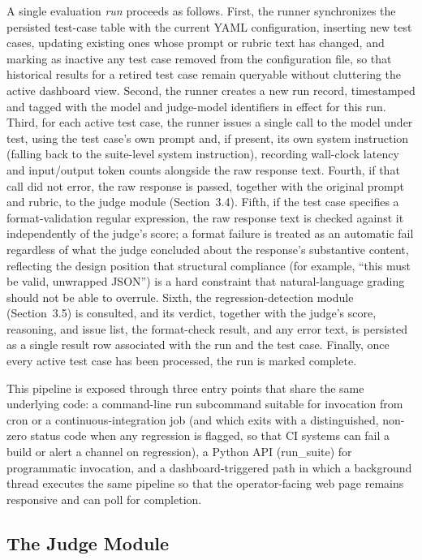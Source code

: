\documentclass[11pt,a4paper]{article}
\begin{document}
A single evaluation \emph{run} proceeds as follows. First, the runner
synchronizes the persisted test-case table with the current YAML
configuration, inserting new test cases, updating existing ones whose
prompt or rubric text has changed, and marking as inactive any test case
removed from the configuration file, so that historical results for a
retired test case remain queryable without cluttering the active
dashboard view. Second, the runner creates a new run record, timestamped
and tagged with the model and judge-model identifiers in effect for this
run. Third, for each active test case, the runner issues a single call
to the model under test, using the test case's own
prompt and, if present, its own system instruction (falling back to the
suite-level system instruction), recording wall-clock latency and
input/output token counts alongside the raw response text. Fourth, if
that call did not error, the raw response is passed, together with the
original prompt and rubric, to the judge module (Section~3.4). Fifth, if
the test case specifies a format-validation regular expression, the raw
response text is checked against it independently of the
judge's score; a format failure is treated as an
automatic fail regardless of what the judge concluded about the
response's substantive content, reflecting the design
position that structural compliance (for example, ``this must be valid,
unwrapped JSON'') is a hard constraint that natural-language grading
should not be able to overrule. Sixth, the regression-detection module
(Section~3.5) is consulted, and its verdict, together with the
judge's score, reasoning, and issue list, the
format-check result, and any error text, is persisted as a single result
row associated with the run and the test case. Finally, once every
active test case has been processed, the run is marked complete.

This pipeline is exposed through three entry points that share the same
underlying code: a command-line run subcommand suitable for invocation
from cron or a continuous-integration job (and which exits with a
distinguished, non-zero status code when any regression is flagged, so
that CI systems can fail a build or alert a channel on regression), a
Python API (run\_suite) for programmatic invocation, and a
dashboard-triggered path in which a background thread executes the same
pipeline so that the operator-facing web page remains responsive and can
poll for completion.

\subsection{The Judge Module}
\end{document}
